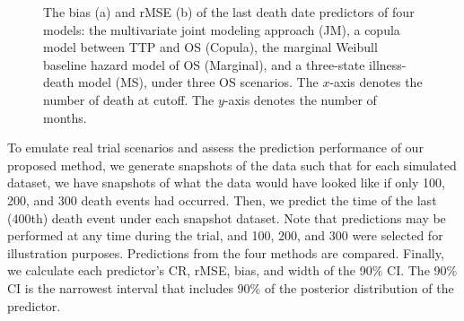 \begin{figure}
\centering
{}
\caption{The bias (a) and rMSE (b) of the last death date predictors of four models: the multivariate joint modeling approach (JM), a copula model between TTP and OS (Copula), the marginal Weibull baseline hazard model of OS (Marginal), and a three-state illness-death model (MS), under three OS scenarios. The $x$-axis denotes the number of death at cutoff. The $y$-axis denotes the number of months. \label{fig:result}}
\end{figure}



To emulate real trial scenarios and assess the prediction performance of our proposed method, we generate snapshots of the data such that for each simulated dataset, we have snapshots of what the data would have looked like if only 100, 200, and 300 death events had occurred. Then, we predict the time of the last (400th) death event under each snapshot dataset. Note that predictions may be performed at any time during the trial, and 100, 200, and 300 were selected for illustration purposes. Predictions from the four methods are compared. Finally, we calculate each predictor's \ac{CR}, \ac{rMSE}, bias, and width of the 90\% \ac{CI}. The 90\% \ac{CI} is the narrowest interval that includes 90\% of the posterior distribution of the predictor. 

